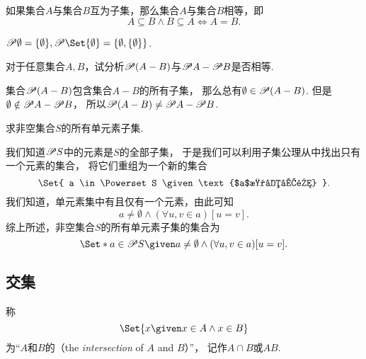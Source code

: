 \begin{theorem}
如果集合\(A\)与集合\(B\)互为子集，那么集合\(A\)与集合\(B\)相等，即\begin{equation*}
	A \subseteq B \land B \subseteq A
	\iff
	A = B.
\end{equation*}
\end{theorem}

\begin{example}
\(\Powerset \emptyset = \{ \emptyset \},%
\Powerset \Set{ \emptyset } = \{ \emptyset, \{ \emptyset \} \}\).
\end{example}

\begin{example}
对于任意集合\(A,B\)，试分析\(\mathscr{P}(A-B)\)与\(\mathscr{P} A - \mathscr{P} B\)是否相等.
\begin{solution}
集合\(\mathscr{P}(A-B)\)包含集合\(A-B\)的所有子集，
那么总有\(\emptyset\in\mathscr{P}(A-B)\).
但是\(\emptyset\notin\mathscr{P} A - \mathscr{P} B\)，
所以\(\mathscr{P}(A-B) \neq \mathscr{P} A - \mathscr{P} B\).
\end{solution}
\end{example}

\begin{example}
求非空集合\(S\)的所有单元素子集.
\begin{solution}
我们知道\(\mathscr{P} S\)中的元素是\(S\)的全部子集，
于是我们可以利用子集公理从中找出只有一个元素的集合，
将它们重组为一个新的集合\begin{equation*}
	\Set{ a \in \Powerset S \given \text{$a$是单元集} }.
\end{equation*}
我们知道，单元素集中有且仅有一个元素，由此可知\begin{equation*}
	a \neq \emptyset
	\land
	(\forall u,v \in a)[u = v].
\end{equation*}
综上所述，非空集合\(S\)的所有单元素子集的集合为\begin{equation*}
	\Set*{
		a \in \Powerset S
		\given
		a \neq \emptyset
		\land
		(\forall u,v \in a)[u = v]
	}.
\end{equation*}
\end{solution}
\end{example}


\subsection{交集}
\begin{definition}
称\begin{equation*}
	\Set{ x \given x \in A \land x \in B }
\end{equation*}为“\(A\)和\(B\)的（the \emph{intersection} of \(A\) and \(B\)）”，
记作\(A \cap B\)或\(AB\).
\end{definition}

